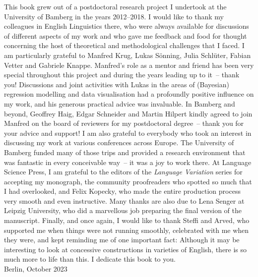 
This book grew out of a postdoctoral research project I undertook at the University of Bamberg in the years 2012–2018. I would like to thank my colleagues in English Linguistics there, who were always available for discussions of different aspects of my work and who gave me feedback and food for thought concerning the host of theoretical and methodo\-logical challenges that I faced. I am particularly grateful to Manfred Krug, Lukas Sönning, Julia Schlüter, Fabian Vetter and Gabriele Knappe. Manfred's role as a mentor and friend has been very special throughout this project and during the years leading up to it~– thank you! Discussions and joint activities with Lukas in the areas of (Bayesian) regression modelling and data visualisation had a profoundly positive influence on my work, and his generous practical advice was invaluable. In Bamberg and beyond, Geoffrey Haig, Edgar Schneider and Martin Hilpert kindly agreed to join Manfred on the board of reviewers for my postdoctoral degree~– thank you for your advice and support! I am also grateful to everybody who took an interest in discussing my work at various conferences across Europe. The University of Bamberg funded many of those trips and provided a research environment that was fantastic in every conceivable way~– it was a joy to work there. At Language Science Press, I am grateful to the editors of the \textit{Language Variation} series for accepting my monograph, the community proofreaders who spotted so much that I had overlooked, and Felix Kopecky, who made the entire production process very smooth and even instructive. Many thanks are also due to Lena Senger at Leipzig University, who did a marvellous job preparing the final version of the manuscript. Finally, and once again, I would like to thank Steffi and Arved, who supported me when things were not running smoothly, celebrated with me when they were, and kept reminding me of one important fact: Although it may be interesting to look at concessive constructions in varieties of English, there is so much more to life than this. I dedicate this book to you.\bigskip\\
\noindent Berlin, October 2023
